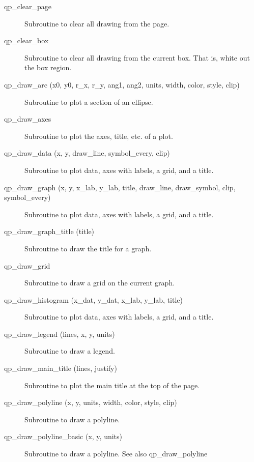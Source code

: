 \begin{description}

\item[qp\_clear\_page] \Newline 
     Subroutine to clear all drawing from the page.

\item[qp\_clear\_box] \Newline 
     Subroutine to clear all drawing from the current box.
     That is, white out the box region.

\item[qp\_draw\_arc (x0, y0, r\_x, r\_y, ang1, ang2, 
                     units, width, color, style, clip) ] \Newline 
     Subroutine to plot a section of an ellipse.

\item[qp\_draw\_axes] \Newline 
     Subroutine to plot the axes, title, etc. of a plot.

\item[qp\_draw\_data (x, y, draw\_line, symbol\_every, clip)] \Newline
     Subroutine to plot data, axes with labels, a grid, and a title.

\item[qp\_draw\_graph (x, y, x\_lab, y\_lab, title, 
                  draw\_line, draw\_symbol, clip, symbol\_every) ] \Newline 
     Subroutine to plot data, axes with labels, a grid, and a title.

\item[qp\_draw\_graph\_title (title)] \Newline 
     Subroutine to draw the title for a graph.

\item[qp\_draw\_grid] \Newline 
     Subroutine to draw a grid on the current graph.

\item[qp\_draw\_histogram (x\_dat, y\_dat, x\_lab, y\_lab, title)] \Newline 
     Subroutine to plot data, axes with labels, a grid, and a title.

\item[qp\_draw\_legend (lines, x, y, units)] \Newline 
     Subroutine to draw a legend.

\item[qp\_draw\_main\_title (lines, justify)] \Newline 
     Subroutine to plot the main title at the top of the page.

\item[qp\_draw\_polyline (x, y, units, width, color, style, clip)] \Newline 
     Subroutine to draw a polyline.

\item[qp\_draw\_polyline\_basic (x, y, units) ] \Newline 
     Subroutine to draw a polyline. See also qp\_draw\_polyline


\end{description}
